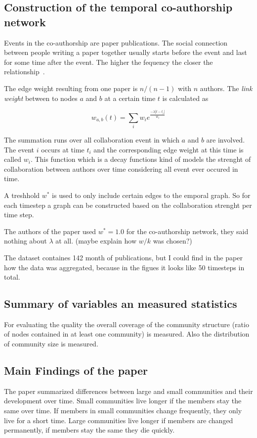 \documentclass[runningheads,a4paper]{llncs}
\begin{document}
\subsection{Construction of the temporal co-authorship network}
\label{evolution-constr}
Events in the co-authorship are paper publications.
The social connection between people writing a paper together usually starts before the event and last for some time after the event. The higher the fequency the closer the relationship~\cite{ramasco2006social}.

The edge weight resulting from one paper is $n/(n-1)$ with $n$ authors. The \emph{link weight} between to nodes $a$ and $b$ at a certain time $t$ is calculated as

$$w_{a,b}(t)= \sum_{i}^{} w_i e^{\frac{-\lambda \left|t-t_i\right|}{w_i}}$$

The summation runs over all collaboration event in which $a$ and $b$ are involved. The event $i$ occurs at time $t_i$ and the corresponding edge weight at this time is called $w_i$. This function which is a decay functions kind of models the strenght of collaboration between authors over time considering all event ever occured in time.

A treshhold $w^*$ is used to only include certain edges to the emporal graph. So for each timestep a graph can be constructed based on the collaboration strenght per time step.

The authors of the paper used $w^*=1.0$ for the co-authorship network, they said nothing about $\lambda$ at all. (maybe explain how $w/k$ was chosen?)

The dataset containes 142 month of publications, but I could find in the paper how the data was aggregated, because in the figues it looks like 50 timesteps in total.

\subsection{Summary of variables an measured statistics}
\label{evolution-vars}
For evaluating the quality the overall coverage of the community structure (ratio of nodes contained in at least one community) is measured. Also the distribution of community size is measured.

\subsection{Main Findings of the paper}
\label{evolution-findings}
The paper summarized differences between large and small communities and their development over time. Small communities live longer if the members stay the same over time. If members in small communities change frequently, they only live for a short time. Large communities live longer if members are changed permanently, if members stay the same they die quickly.
\end{document}
